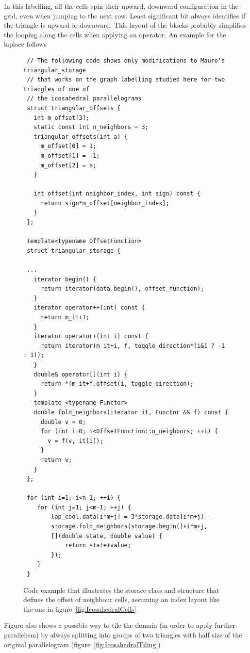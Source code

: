 \documentclass{book}
\begin{document}
In this labelling, all the cells spin their upward, downward configuration in the grid, even when jumping to the next row. 
Least significant bit always identifies if the triangle is upward or downward.  
This layout of the blocks probably simplifies the looping along the cells when applying an operator. An example for the laplace follows
\begin{figure}[htb!]
\begin{verbatim}
 // The following code shows only modifications to Mauro's triangular_storage
 // that works on the graph labelling studied here for two triangles of one of 
 // the icosahedral parallelograms
 struct triangular_offsets {
   int m_offset[3];
   static const int n_neighbors = 3;
   triangular_offsets(int a) {
     m_offset[0] = 1;
     m_offset[1] = -1;
     m_offset[2] = a;
   }
 
   int offset(int neighbor_index, int sign) const {
     return sign*m_offset[neighbor_index];
   }
 };
 
 template<typename OffsetFunction>
 struct triangular_storage {
 
 ...
   iterator begin() {
     return iterator(data.begin(), offset_function);
   }
   iterator operator++(int) const {
     return m_it+1;
   }
   iterator operator+(int i) const {
     return iterator(m_it+i, f, toggle_direction*(i&1 ? -1 : 1));
   }
   double& operator[](int i) {
     return *(m_it+f.offset(i, toggle_direction);
   }
   template <typename Functor>
   double fold_neighbors(iterator it, Functor && f) const {
     double v = 0;
     for (int i=0; i<OffsetFunction::n_neighbors; ++i) {
       v = f(v, it[i]);
     }
     return v;
   }
 };
 
 for (int i=1; i<n-1; ++i) {
 	for (int j=1; j<m-1; ++j) {
 		lap_cool.data[i*m+j] = 3*storage.data[i*m+j] -
 		storage.fold_neighbors(storage.begin()+i*m+j,
 		[](double state, double value) {
 			return state+value;
 		});
 	}
 }
\end{verbatim}
	\caption{Code example that illustrates the storace class and structure that defines the offset of neighbour cells, assuming an index layout like the one in figure~\ref{fig:IcosahedralCells} }
	\label{lst:TriangularOffsets}
\end{figure}

Figure also shows a possible way to tile the domain (in order to apply further parallelism) by always splitting into groups of two triangles with half size of the original parallelogram (figure~\ref{fig:IcosahedralTiling})
\end{document}
